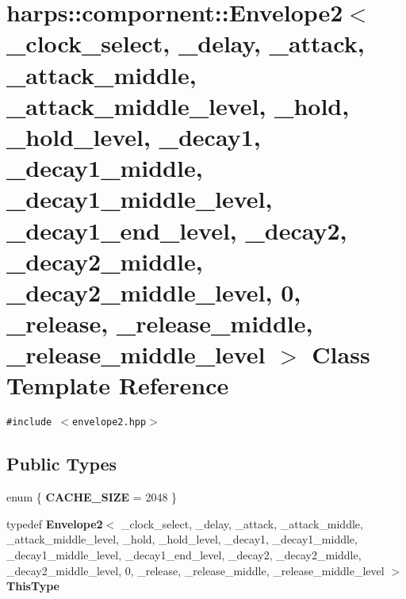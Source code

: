 \section{harps::compornent::Envelope2$<$ \_\-clock\_\-select, \_\-delay, \_\-attack, \_\-attack\_\-middle, \_\-attack\_\-middle\_\-level, \_\-hold, \_\-hold\_\-level, \_\-decay1, \_\-decay1\_\-middle, \_\-decay1\_\-middle\_\-level, \_\-decay1\_\-end\_\-level, \_\-decay2, \_\-decay2\_\-middle, \_\-decay2\_\-middle\_\-level, 0, \_\-release, \_\-release\_\-middle, \_\-release\_\-middle\_\-level $>$ Class Template Reference}
\label{classharps_1_1compornent_1_1Envelope2_3_01__clock__select_00_01__delay_00_01__attack_00_01__atta211bf396f5638f048319b2d4e63e7d8c}
{\tt \#include $<$envelope2.hpp$>$}

\subsection*{Public Types}
\begin{CompactItemize}
\item 
enum \{ \textbf{CACHE\_\-SIZE} =  2048
 \}
\item 
typedef {\bf Envelope2}$<$ \_\-clock\_\-select, \_\-delay, \_\-attack, \_\-attack\_\-middle, \_\-attack\_\-middle\_\-level, \_\-hold, \_\-hold\_\-level, \_\-decay1, \_\-decay1\_\-middle, \_\-decay1\_\-middle\_\-level, \_\-decay1\_\-end\_\-level, \_\-decay2, \_\-decay2\_\-middle, \_\-decay2\_\-middle\_\-level, 0, \_\-release, \_\-release\_\-middle, \_\-release\_\-middle\_\-level $>$ \textbf{ThisType}\label{classharps_1_1compornent_1_1Envelope2_3_01__clock__select_00_01__delay_00_01__attack_00_01__atta211bf396f5638f048319b2d4e63e7d8c_37d98f73a2a68ca59058bc1aa81d5bb8}

\end{CompactItemize}

